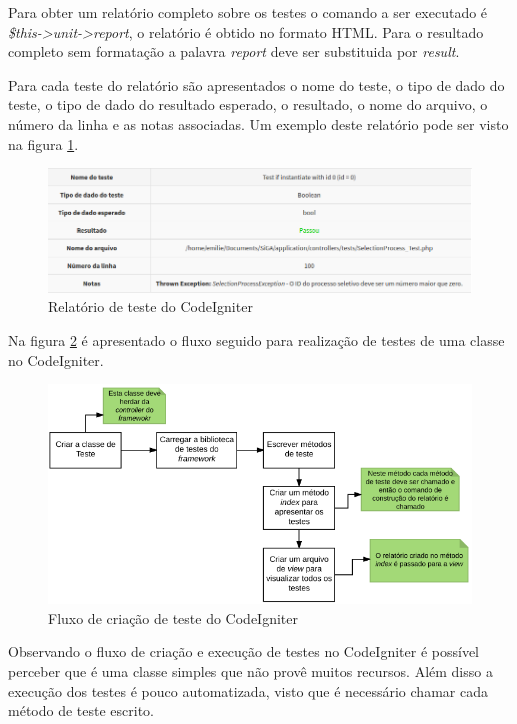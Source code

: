 Para obter um relatório completo sobre os testes o comando a ser executado é \textit{\$this->unit->report}, 
o relatório é obtido no formato HTML. Para o resultado completo sem formatação a palavra \textit{report} deve ser
substituida por \textit{result}.

Para cada teste do relatório são apresentados o nome do teste, o tipo de dado do teste, o tipo de 
dado do resultado esperado, o resultado, o nome do arquivo, o número da linha e as notas associadas.
Um exemplo deste relatório pode ser visto na figura \ref{fig:relatorio_codeigniter}.

\begin{figure}[!h]
\centering
\includegraphics[scale=0.7]{figuras/relatorio_codeigniter.png}
\caption{Relatório de teste do CodeIgniter}
\label{fig:relatorio_codeigniter}
\end{figure}

Na figura \ref{fig:fluxo_codeigniter} é apresentado o fluxo seguido para realização de testes de uma classe no CodeIgniter.

\begin{figure}[!h]
\centering
\includegraphics[scale=0.7]{figuras/fluxo_codeigniter.png}
\caption{Fluxo de criação de teste do CodeIgniter}
\label{fig:fluxo_codeigniter}
\end{figure}

Observando o fluxo de criação e execução de testes no CodeIgniter é possível perceber que é uma classe simples que não provê muitos recursos. Além disso a execução dos testes é pouco automatizada, visto que é necessário chamar cada método
de teste escrito. 

